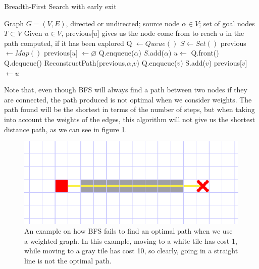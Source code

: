 \documentclass[12pt]{report}
\begin{document}
\begin{algorithm}
\caption{Breadth-First Search with early exit}
\label{alg:bfs_early_exit}
\begin{algorithmic}[1]
\Require Graph $G = (V, E)$, directed or undirected; source node $\alpha \in V$; set of goal nodes $T \subset V$
\Ensure Given $u \in V$, previous[$u$] gives us the node come from to reach $u$ in the path computed, if it has been explored
\State Q $\gets Queue()$
\State $S \gets Set()$
\State previous $\gets Map()$
	\State previous[$u$] $\gets \varnothing$
\EndFor
\State Q.enqueue($\alpha$)
\State $S$.add($\alpha$)
	\State $u \gets$ Q.front()
	\State Q.dequeue()
			 
				\State \Return ReconstructPath(previous,$\alpha$,$v$)
			\EndIf
			\State Q.enqueue($v$)
			\State S.add($v$)
			\State previous[$v$] $\gets u$
		\EndIf
	\EndFor
\EndWhile
\EndProcedure
\end{algorithmic}
\end{algorithm}

Note that, even though BFS will always find a path between two nodes if they are connected, the path produced is not optimal when we consider weights. The path found will be the shortest in terms of the number of steps, but when taking into account the weights of the edges, this algorithm will not give us the shortest distance path, as we can see in figure \ref{fig:bfs-fail}.

\begin{figure}
\centering
\includegraphics[width=1\linewidth]{bfs-fail}
\caption{An example on how BFS fails to find an optimal path when we use a weighted graph. In this example, moving to a white tile has cost 1, while moving to a gray tile has cost 10, so clearly, going in a straight line is not the optimal path.}
\label{fig:bfs-fail}
\end{figure}
\end{document}
